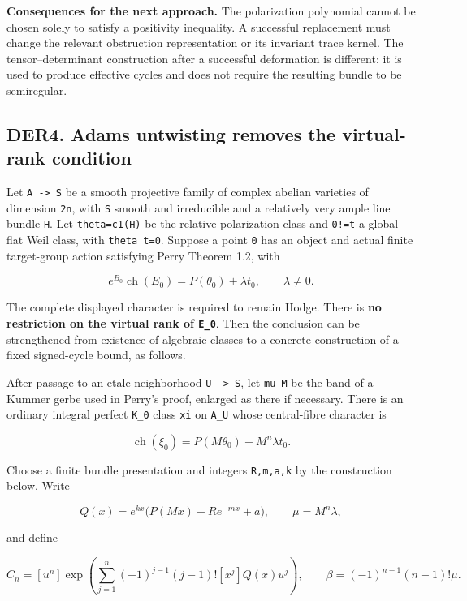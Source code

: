 \documentclass[11pt,a4paper]{article}
\theoremstyle{definition}
\begin{document}
\textbf{Consequences for the next approach.} The polarization polynomial
cannot be chosen solely to satisfy a positivity inequality. A successful
replacement must change the relevant obstruction representation or its
invariant trace kernel. The tensor--determinant construction after a
successful deformation is different: it is used to produce effective
cycles and does not require the resulting bundle to be semiregular.

\subsection{DER4. Adams untwisting removes the virtual-rank
condition}\label{derived-candidates-der4.-adams-untwisting-removes-the-virtual-rank-condition}

Let \texttt{A\ -\textgreater{}\ S} be a smooth projective family of
complex abelian varieties of dimension \texttt{2n}, with \texttt{S}
smooth and irreducible and a relatively very ample line bundle
\texttt{H}. Let \texttt{theta=c1(H)} be the relative polarization class
and \texttt{0!=t} a global flat Weil class, with \texttt{theta\ t=0}.
Suppose a point \texttt{0} has an object and actual finite target-group
action satisfying Perry Theorem 1.2, with

\[
 e^{B_0}\operatorname{ch}(E_0)=P(\theta_0)+\lambda t_0,
 \qquad \lambda\ne0.
\tag{DER4a}
\]

The complete displayed character is required to remain Hodge. There is
\textbf{no restriction on the virtual rank of \texttt{E\_0}}. Then the
conclusion can be strengthened from existence of algebraic classes to a
concrete construction of a fixed signed-cycle bound, as follows.

After passage to an etale neighborhood \texttt{U\ -\textgreater{}\ S},
let \texttt{mu\_M} be the band of a Kummer gerbe used in Perry's proof,
enlarged as there if necessary. There is an ordinary integral perfect
\texttt{K\_0} class \texttt{xi} on \texttt{A\_U} whose central-fibre
character is

\[
 \operatorname{ch}(\xi_0)=P(M\theta_0)+M^n\lambda t_0.
\tag{DER4b}
\]

Choose a finite bundle presentation and integers \texttt{R,m,a,k} by the
construction below. Write

\[
 Q(x)=e^{kx}\bigl(P(Mx)+R e^{-mx}+a\bigr),
 \qquad \mu=M^n\lambda,
\]

and define

\[
 C_n=[u^n]\exp\!\left(
 \sum_{j=1}^{n}(-1)^{j-1}(j-1)![x^j]Q(x)u^j\right),
 \qquad \beta=(-1)^{n-1}(n-1)!\mu.
\tag{DER4c}
\]
\end{document}
